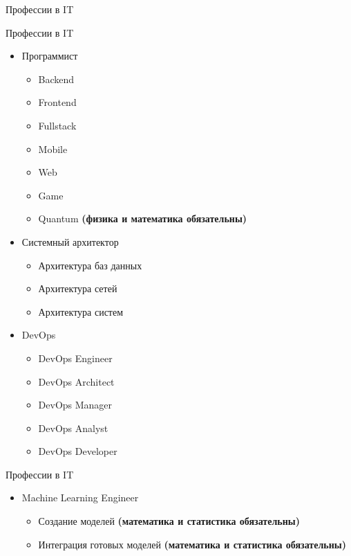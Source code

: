\documentclass{beamer}
\begin{document}
\begin{section}{Профессии в IT}
    \begin{frame}{Профессии в IT}
        \begin{itemize}
            \item Программист \begin{itemize}
                \item Backend  
                \item Frontend  
                \item Fullstack 
                \item Mobile
                \item Web 
                \item Game 
                \item Quantum \textbf{(физика и математика обязательны)}
            \end{itemize}
            \item Системный архитектор \begin{itemize}
                \item Архитектура баз данных
                \item Архитектура сетей
                \item Архитектура систем
            \end{itemize}
            \item DevOps \begin{itemize}
                \item DevOps Engineer
                \item DevOps Architect
                \item DevOps Manager
                \item DevOps Analyst
                \item DevOps Developer 
            \end{itemize}
            \end{itemize}
        \end{frame}
        \begin{frame}{Профессии в IT}
            \begin{itemize}
            \item Machine Learning Engineer \begin{itemize}
                \item Создание моделей \textbf{(математика и статистика обязательны)}
                \item Интеграция готовых моделей \textbf{(математика и статистика обязательны)}

\end{itemize}
\end{itemize}
\end{frame}
\end{section}
\end{document}

